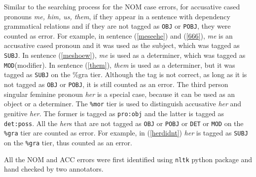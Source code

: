 Similar to the searching process for the NOM case errors, for accusative cased pronouns \textit{me, him, us, them}, if they appear in a sentence with dependency grammatical relations and if they are not tagged as \texttt{OBJ} or \texttt{POBJ}, they were counted as error. For example, in sentence (\ref{meseehe}) and (\ref{666}), \textit{me} is an accusative cased pronoun and it was used as the subject, which was tagged as \texttt{SUBJ}. In sentence (\ref{meshoew}), \textit{me} is used as a determiner, which was tagged as \texttt{MOD}(modifier). In sentence (\ref{them}), \textit{them} is used as a determiner, but it was tagged as \texttt{SUBJ} on the \%gra tier. Although the tag is not correct, as long as it is not tagged as \texttt{OBJ} or \texttt{POBJ}, it is still counted as an error. The third person singular feminine pronoun \textit{her} is a special case, because it can be used as an object or a determiner. The \texttt{\%mor} tier is used to distinguish accusative \textit{her} and genitive \textit{her}. The former is tagged as \texttt{pro:obj} and the latter is tagged as \texttt{det:poss}. All the \textit{her}s that are not tagged as \texttt{OBJ} or \texttt{POBJ} or \texttt{DET} or \texttt{MOD} on the \texttt{\%gra} tier are counted as error. For example, in (\ref{herdidnt}) \textit{her} is tagged as \texttt{SUBJ} on the \texttt{\%gra} tier, thus counted as an error. 

All the NOM and ACC errors were first identified using \texttt{nltk} python package and hand checked by two annotators. 

